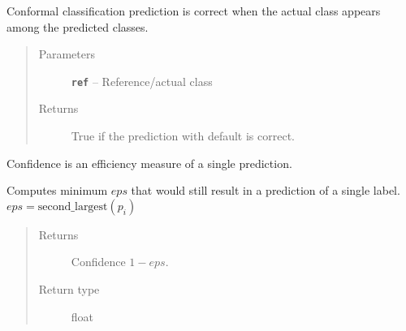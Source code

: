 \documentclass[letterpaper,10pt,english]{sphinxmanual}
\begin{document}
\begin{fulllineitems}
\begin{fulllineitems}
\begin{quote}
\begin{description}
\end{description}\end{quote}

\end{fulllineitems}


\begin{fulllineitems}
\label{cp.classification:cp.classification.PredictionClass.verdict}
Conformal classification prediction is correct when the actual class appears
among the predicted classes.
\begin{quote}\begin{description}
\item[{Parameters}] \leavevmode
\textbf{\texttt{ref}} -- Reference/actual class

\item[{Returns}] \leavevmode
True if the prediction with default  is correct.

\end{description}\end{quote}

\end{fulllineitems}


\begin{fulllineitems}
\label{cp.classification:cp.classification.PredictionClass.confidence}
Confidence is an efficiency measure of a single prediction.

Computes minimum \(\mathit{eps}\) that would still result in a prediction of a single label.
\(\mathit{eps} = \text{second\_largest}(p_i)\)
\begin{quote}\begin{description}
\item[{Returns}] \leavevmode
Confidence \(1-\mathit{eps}\).

\item[{Return type}] \leavevmode
float

\end{description}\end{quote}

\end{fulllineitems}



\end{fulllineitems}
\end{document}
